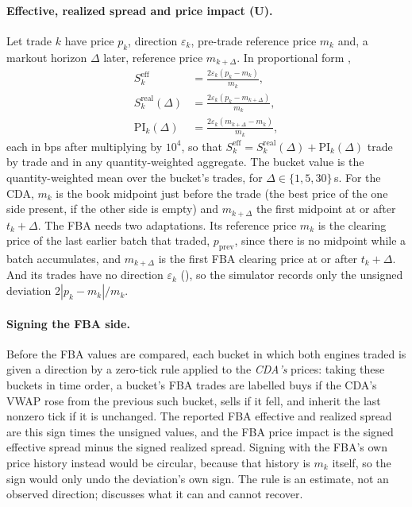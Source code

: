 \paragraph{Effective, realized spread and price impact (U).} Let trade
$k$ have price $p_k$, direction $\varepsilon_k$, pre-trade reference price $m_k$
and, a markout horizon $\Delta$ later, reference price $m_{k+\Delta}$.
In proportional form \citep{hasbrouck1993assessing,hendershott2011algorithmic},
\begin{align}
  S^{\mathrm{eff}}_k &= \frac{2 \varepsilon_k (p_k - m_k)}{m_k},
    \label{eq:effspread}\\[3pt]
  S^{\mathrm{real}}_k(\Delta) &= \frac{2 \varepsilon_k (p_k - m_{k+\Delta})}{m_k},
    \label{eq:realspread}\\[3pt]
  \mathrm{PI}_k(\Delta) &= \frac{2 \varepsilon_k (m_{k+\Delta} - m_k)}{m_k},
    \label{eq:priceimpact}
\end{align}
each in bps after multiplying by $10^{4}$, so that $S^{\mathrm{eff}}_k =
S^{\mathrm{real}}_k(\Delta) + \mathrm{PI}_k(\Delta)$ trade by trade and in
any quantity-weighted aggregate. The bucket value is the
quantity-weighted mean over the bucket's trades, for $\Delta \in
\{1, 5, 30\}$\,s. For the CDA, $m_k$ is the book midpoint just before the
trade (the best price of the one side present, if the other side is
empty) and $m_{k+\Delta}$ the first midpoint at or after $t_k + \Delta$.
The FBA needs two adaptations. Its reference price $m_k$ is the clearing
price of the last earlier batch that traded, $p_{\mathrm{prev}}$, since
there is no midpoint while a batch accumulates, and $m_{k+\Delta}$ is the
first FBA clearing price at or after $t_k + \Delta$. And its trades have no direction $\varepsilon_k$
(), so the simulator records only the unsigned
deviation $2|p_k - m_k|/m_k$.

\paragraph{Signing the FBA side.} Before the FBA values are compared, each
bucket in which both engines traded is given a direction by a zero-tick
rule \citep{leeready1991} applied to the \emph{CDA's} prices: taking these
buckets in time order, a bucket's FBA trades are labelled buys if the CDA's
VWAP rose from the previous such bucket, sells if it fell, and inherit the
last nonzero tick if it is unchanged. The reported
FBA effective and realized spread are this sign times the unsigned
values, and the FBA price impact is the signed effective spread minus the
signed realized spread. Signing with the FBA's own price history instead
would be circular, because that history is $m_k$ itself, so the sign
would only undo the deviation's own sign. The rule is an estimate, not
an observed direction;  discusses what it can and cannot
recover.

